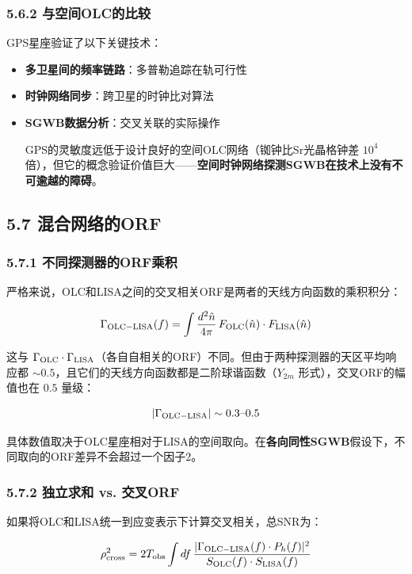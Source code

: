 \documentclass[12pt,a4paper]{article}
\begin{document}
\subsubsection{5.6.2 与空间OLC的比较}


GPS星座验证了以下关键技术：
\begin{itemize}
  \item[1] \textbf{多卫星间的频率链路}：多普勒追踪在轨可行性
  \item[2] \textbf{时钟网络同步}：跨卫星的时钟比对算法
  \item[3] \textbf{SGWB数据分析}：交叉关联的实际操作

GPS的灵敏度远低于设计良好的空间OLC网络（铷钟比Sr光晶格钟差 $10^4$ 倍），但它的概念验证价值巨大——\textbf{空间时钟网络探测SGWB在技术上没有不可逾越的障碍}。

\end{itemize}
\subsection{5.7 混合网络的ORF}


\subsubsection{5.7.1 不同探测器的ORF乘积}


严格来说，OLC和LISA之间的交叉相关ORF是两者的天线方向函数的乘积积分：

$$\Gamma_{\rm OLC-LISA}(f) = \int \frac{d^2\hat{n}}{4\pi}\, F_{\rm OLC}(\hat{n}) \cdot F_{\rm LISA}(\hat{n})$$

这与 $\Gamma_{\rm OLC} \cdot \Gamma_{\rm LISA}$（各自自相关的ORF）不同。但由于两种探测器的天区平均响应都 $\sim 0.5$，且它们的天线方向函数都是二阶球谐函数（$Y_{2m}$ 形式），交叉ORF的幅值也在 $0.5$ 量级：

$$|\Gamma_{\rm OLC-LISA}| \sim 0.3\text{--}0.5$$

具体数值取决于OLC星座相对于LISA的空间取向。在\textbf{各向同性SGWB}假设下，不同取向的ORF差异不会超过一个因子2。

\subsubsection{5.7.2 独立求和 vs. 交叉ORF}


如果将OLC和LISA统一到应变表示下计算交叉相关，总SNR为：

$$\rho_{\rm cross}^2 = 2 T_{\rm obs} \int df\, \frac{|\Gamma_{\rm OLC-LISA}(f) \cdot P_h(f)|^2}{S_{\rm OLC}(f) \cdot S_{\rm LISA}(f)}$$
\end{document}
